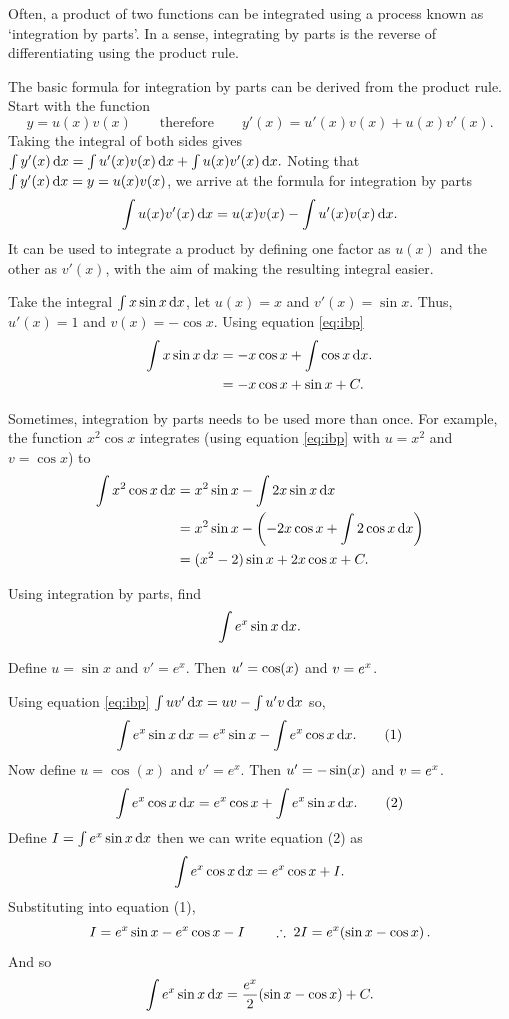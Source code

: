 Often, a product of two functions can be integrated using a process known as `integration by parts'. In a sense, integrating by parts is the reverse of differentiating using the product rule.

The basic formula for integration by parts can be derived from the product rule. Start with the function
\[
y=u(x)v(x) \qquad\text{therefore}\qquad y'(x)=u'(x)v(x)+u(x)v'(x).
\]
Taking the integral of both sides gives $\int y'(x)\,{\rm d}x=\int u'(x)v(x)\,{\rm d}x+\int u(x)v'(x)\,{\rm d}x.$ Noting that $\int y'(x)\,{\rm d}x=y=u(x)v(x)$, we arrive at the formula for integration by parts
\begin{equation}
\label{eq:ibp} \int u(x)v'(x)\,{\rm d}x=u(x)v(x)-\int u'(x)v(x)\,{\rm d}x.
\end{equation}
It can be used to integrate a product by defining one factor as $u(x)$ and the other as $v'(x)$, with the aim of making the resulting integral easier.

Take the integral $\int x\sin x\,{\rm d}x$, let $u(x)=x$ and $v'(x)=\sin x$. Thus, $u'(x)=1$ and $v(x)=-\cos x$. Using equation \eqref{eq:ibp}
\begin{align*}
\int x\sin x\,{\rm d}x &= -x\cos x+\int\cos x\,{\rm d}x.\\
&=-x\cos x+\sin x+C.
\end{align*}

Sometimes, integration by parts needs to be used more than once. For example, the function $x^2\cos x$ integrates (using equation \eqref{eq:ibp} with $u=x^2$ and $v=\cos x$) to
\begin{align*}
    \int x^2\cos x\,{\rm d}x &= x^2\sin x-\int2x\sin x\,{\rm d}x\\
    &= x^2\sin x-\left(-2x\cos x+\int2\cos x\,{\rm d}x\right)\\
    &=(x^2-2)\sin x+2x\cos x+C.
\end{align*}

\begin{example}[Lecture]
Using integration by parts, find
\[
\int e^x\sin x\,{\rm d}x.
\]
\end{example}

\begin{solution}
Define $u=\sin x$ and $v'=e^x$. Then $u'=\cos(x)$ and $v=e^x$.

Using equation \eqref{eq:ibp} $\int uv'\,{\rm d}x=uv-\int u'v\,{\rm d}x$ so,
\[
\int e^x\sin x\,{\rm d}x=e^x\sin x-\int e^x\cos x\,{\rm d}x. \tag{1}
\]
Now define $u=\cos(x)$ and $v'=e^x$. Then $u'=-\sin(x)$ and $v=e^x$.
\[
\int e^x\cos x\,{\rm d}x=e^x\cos x + \int e^x\sin x\,{\rm d}x. \tag{2}
\]
Define $I=\int e^x\sin x\,{\rm d}x$ then we can write equation (2) as
\[
\int e^x\cos x\,{\rm d}x = e^x\cos x+I.
\]
Substituting into equation (1),
\[
I=e^x\sin x-e^x\cos x-I
\qquad \therefore \;
2I=e^x(\sin x-\cos x)\, .
\]
And so
\[
\int e^x\sin x\,{\rm d}x=\frac{e^x}{2}(\sin x-\cos x)+C.
\]
\end{solution}

